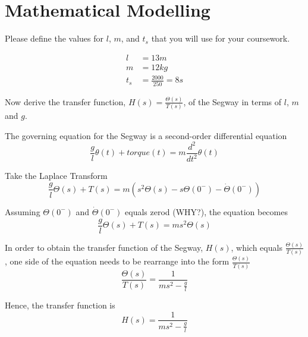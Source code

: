 \section{Mathematical Modelling}

\begin{questions}

\question[1E]
Please define the values for $l$, $m$, and $t_s$ that you will use for your coursework.

\begin{solution}
   \begin{align*}
   l &= 13m  \\
   m &= 12kg \\
   t_s &= \frac{2000}{250} = 8s
   \end{align*}
\end{solution}

\question[1E]
Now derive the transfer function, $H(s) = \frac{\Theta(s)}{T(s)}$, of the Segway in terms of $l$, $m$ and $g$.

\begin{solution}
   The governing equation for the Segway is a second-order differential equation
   \begin{equation*}
   \frac{g}{l}\theta(t) + torque(t) = m\frac{d^2}{dt^2}\theta(t)
   \end{equation*}

   Take the Laplace Transform
   \begin{equation*}
   \frac{g}{l}\Theta(s) + T(s) = m(s^2\Theta(s) - s\Theta(0^-) - \dot{\Theta}(0^-))
   \end{equation*}

   Assuming $\Theta(0^-)$ and $\dot{\Theta}(0^-)$ equals zerod (WHY?), the equation becomes
   \begin{equation*}
   \frac{g}{l}\Theta(s) + T(s) = ms^2\Theta(s)
   \end{equation*}

   In order to obtain the transfer function of the Segway, $H(s)$, which equals $\frac{\Theta(s)}{T(s)}$, one side of the equation needs to be rearrange into the form $\frac{\Theta(s)}{T(s)}$
   \begin{equation*}
   \frac{\Theta(s)}{T(s)} = \frac{1}{ms^2-\frac{g}{l}}
   \end{equation*}

   Hence, the transfer function is
   \begin{equation}\label{eq:TF_of_Segway}
   H(s) = \frac{1}{ms^2-\frac{g}{l}}
   \end{equation}
\end{solution}


\end{questions}
